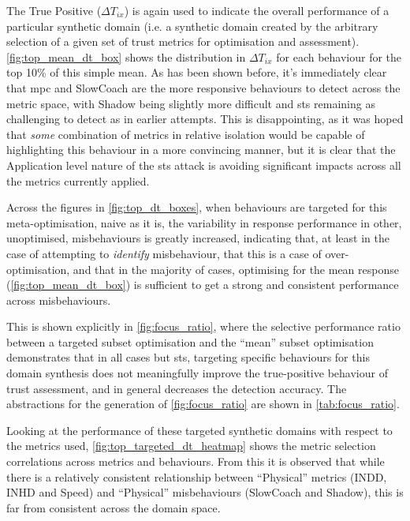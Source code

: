 The True Positive ($\Delta T_{ix}$) is again used to indicate the overall performance of a particular synthetic domain (i.e. a synthetic domain created by the arbitrary selection of a given set of trust metrics for optimisation and assessment).
\autoref{fig:top_mean_dt_box} shows the distribution in $\Delta T_{ix}$ for each behaviour for the top 10\% of this simple mean.
As has been shown before, it's immediately clear that \gls{mpc} and SlowCoach are the more responsive behaviours to detect across the metric space, with Shadow being slightly more difficult and \gls{sts} remaining as challenging to detect as in earlier attempts.
This is disappointing, as it was hoped that \emph{some} combination of metrics in relative isolation would be capable of highlighting this behaviour in a more convincing manner, but it is clear that the Application level nature of the \gls{sts} attack is avoiding significant impacts across all the metrics currently applied.

Across the figures in \autoref{fig:top_dt_boxes}, when behaviours are targeted for this meta-optimisation, naive as it is, the variability in response performance in other, unoptimised, misbehaviours is greatly increased, indicating that, at least in the case of attempting to \emph{identify} misbehaviour, that this is a case of over-optimisation, and that in the majority of cases, optimising for the mean response (\autoref{fig:top_mean_dt_box}) is sufficient to get a strong and consistent performance across misbehaviours.

This is shown explicitly in \autoref{fig:focus_ratio}, where the selective performance ratio between a targeted subset optimisation and the ``mean'' subset optimisation demonstrates that in all cases but \gls{sts}, targeting specific behaviours for this domain synthesis does not meaningfully improve the true-positive behaviour of trust assessment, and in general decreases the detection accuracy.
The abstractions for the generation of \autoref{fig:focus_ratio} are shown in \autoref{tab:focus_ratio}.

Looking at the performance of these targeted synthetic domains with respect to the metrics used, \autoref{fig:top_targeted_dt_heatmap} shows the metric selection correlations across metrics and behaviours.
From this it is observed that while there is a relatively consistent relationship between ``Physical'' metrics (INDD, INHD and Speed) and ``Physical'' misbehaviours (SlowCoach and Shadow), this is far from consistent across the domain space. 

